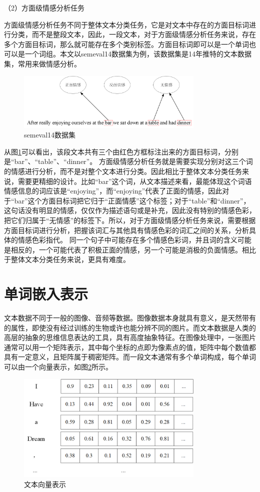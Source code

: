 （2）方面级情感分析任务

方面级情感分析任务不同于整体文本分类任务，它是对文本中存在的方面目标词进行分类，而不是整段文本，因此，一段文本，对于方面级情感分析任务来说，存在多个方面目标词，那么就可能存在多个类别标签。方面目标词即可以是一个单词也可以是一个词组。本文以semeval14数据集为例，该数据集是14年推特的文本数据集，常用来做情感分析。
\begin{figure}[htb]%
	\setlength{\belowcaptionskip}{0pt}
	\centering
	\includegraphics[width=0.8\textwidth]{pic/2-2.png}
	\caption{semeval14数据集}
	\label{semeval14datasets}
\end{figure}

从图\ref{semeval14datasets}可以看出，该段文本共有三个由红色方框标注出来的方面目标词，分别是“bar”、“table”、“dinner”。
方面级情感分析任务就是需要实现分别对这三个词的情感进行分析，而不是对整个文本进行分类。因此相比于整体文本分类任务来说，需要更精细的设计。比如“bar”这个词，从文本描述来看，最能体现这个词语情感信息的词应该是“enjoying”，而“enjoying”代表了正面的情感，因此对于“bar”这个方面目标词把它归于“正面情感”这个标签；对于“table”和“dinner”，这句话没有明显的情感，仅仅作为描述语句或是补充，因此没有特别的情感色彩，把它们归属于“无情感”的标签下。所以，对于方面级情感分析任务来说，需要根据方面目标词进行分析，把握该词汇与其他具有情感色彩的词汇之间的关系，分析具体的情感色彩指代。
同一个句子中可能存在多个情感色彩词，并且词的含义可能是相反的，一个可能代表了积极正面的情感，另一个可能是消极的负面情感。相比于整体文本分类任务来说，更具有难度。
\section{单词嵌入表示}
文本数据不同于一般的图像、音频等数据。图像数据本身就具有意义，是天然带有的属性，即使没有经过训练的生物或许也能分辨不同的图片。而文本数据是人类的高层的抽象的思维信息表达的工具，具有高度抽象特征。在图像处理中，一张图片通常可以用一个矩阵表示，其中每个坐标的点即为像素点的值，矩阵中每个数值都具有一定意义，且矩阵属于稠密矩阵。而一段文本通常有多个单词构成，每个单词可以由一个向量表示，如图\ref{textEmb}所示。
\begin{figure}[htb]%
	\setlength{\belowcaptionskip}{0pt}
	\centering
	\includegraphics[width=0.8\textwidth]{pic/2-3.png}
	\caption{文本向量表示}
	\label{textEmb}
\end{figure}

